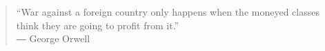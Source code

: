 \begin{quote}
	“War against a foreign country only happens when the moneyed classes think they are going to profit from it.”\\
	― George Orwell~\autocite{orwell-quote}
\end{quote}



